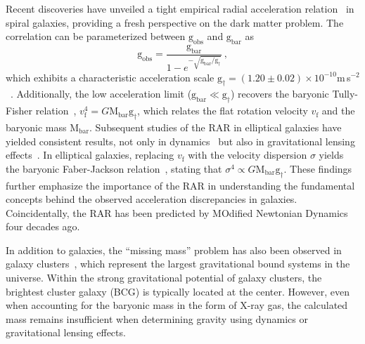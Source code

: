 \documentclass[a4paper, two-column, twocolappendix]{aa}
\newcommand{\Mbar}{\mathrm{M}_\mathrm{bar}}
\newcommand{\gbar}{\mathrm{g}_\mathrm{bar}}
\newcommand{\gobs}{\mathrm{g}_\mathrm{obs}}
\newcommand{\gdag}{\mathrm{g}_\mathrm{\dagger}}
\begin{document}
Recent discoveries have unveiled a tight empirical radial acceleration relation~\citep[RAR;][]{McGaugh16, Lelli17} in spiral galaxies, 
 providing a fresh perspective on the dark matter problem. 
The correlation can be parameterized between $\gobs$ and $\gbar$ as
\begin{equation}
\label{eq:RAR}
 \gobs=\frac{\gbar}{1-e^{-\sqrt{\gbar/\gdag}}}\,,
\end{equation} 
 which exhibits a characteristic acceleration scale $\gdag=(1.20\pm0.02)\times10^{-10}$m\,s$^{-2}$~\citep{McGaugh16, Lelli17, Li18}.
Additionally, the low acceleration limit ($\gbar\ll\gdag$) recovers 
 the baryonic Tully-Fisher relation~\citep[BTFR;][]{McGaugh00, Verheijen01, McGaugh11, Lelli16, Lelli19}, $v_{\mathrm{f}}^4=G\Mbar\gdag$, 
 which relates the flat rotation velocity $v_{\mathrm{f}}$ and the baryonic mass $\Mbar$.
Subsequent studies of the RAR in elliptical galaxies have yielded consistent results, 
 not only in dynamics~\citep{Lelli17, Chae19, Chae20} but also in gravitational lensing effects~\citep{TK19, Brouwer21}. 
In elliptical galaxies, replacing $v_{\mathrm{f}}$ with the velocity dispersion $\sigma$ 
 yields the baryonic Faber-Jackson relation~\citep[BFJR;][]{Sanders10, FM12}, 
 stating that $\sigma^4\propto G\Mbar\gdag$.
These findings further emphasize the importance of the RAR in understanding the fundamental concepts 
 behind the observed acceleration discrepancies in galaxies.
Coincidentally, the RAR has been predicted by MOdified Newtonian Dynamics~\citep[MOND;][]{Milgrom83} 
 four decades ago.


In addition to galaxies, the ``missing mass'' problem has also been observed 
 in galaxy clusters~\citep{Zwicky33, FM12, Overzier16, Rines16, Umetsu20}, 
  which represent the largest gravitational bound systems in the universe. 
Within the strong gravitational potential of galaxy clusters, 
 the brightest cluster galaxy (BCG) is typically located at the center. 
However, even when accounting for the baryonic mass in the form of X-ray gas, 
 the calculated mass remains insufficient when determining gravity using dynamics or gravitational lensing effects.
 
\end{document}
